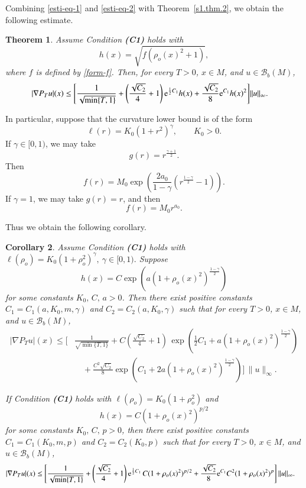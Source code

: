 \documentclass[11pt,twoside, reqno]{article}
\def\e{{\rm e}}
\newcommand\1{\mathbbm{1}}
\newtheorem{theorem}{Theorem}[section]
\newtheorem{corollary}[theorem]{Corollary}
\theoremstyle{definition}
\numberwithin{equation}{section}
\def \e{{\rm e}}
\begin{document}
Combining \eqref{esti-eq-1} and \eqref{esti-eq-2} with
Theorem~\ref{s1.thm.2}, we obtain the following estimate.

\begin{theorem}\label{h-theorem}
Assume Condition {\bf(C1)} holds with
\[
        h(x)=\sqrt{f(\rho_o(x)^2+1)},
\]
where \(f\) is defined by \eqref{form-f}. Then, for every \(T>0\),
\(x\in M\), and \(u\in\mathcal B_b(M)\),
\[
\begin{aligned}
|\nabla P_Tu|(x)
\leq
\Bigg[
&
\frac1{\sqrt{\min\{T,1\}}}
+
\left(\frac{\sqrt{C_2}}4+1\right)
\e^{\frac{1}{2}C_1} h(x)
+
\frac{\sqrt{C_2}}8
\e^{C_1}h(x)^2
\Bigg]\|u\|_\infty .
\end{aligned}
\]
\end{theorem}

In particular, suppose that the curvature lower bound is of the form
\[
        \ell(r)=K_0(1+r^2)^\gamma,
        \qquad K_0>0.
\]
If \(\gamma\in[0,1)\), we may take
\[
        g(r)=r^{\frac{\gamma+1}{2}}.
\]
Then
\[
        f(r)
        =
        M_0
        \exp\left(
        \frac{2a_0}{1-\gamma}
        \left(r^{\frac{1-\gamma}{2}}-1\right)
        \right).
\]
If \(\gamma=1\), we may take \(g(r)=r\), and then
\[
        f(r)=M_0r^{a_0}.
\]

Thus we obtain the following corollary.

\begin{corollary}\label{examples}
Assume Condition {\bf(C1)} holds with
\(
        \ell(\rho_o)=K_0(1+\rho_o^2)^\gamma,    \ 
        \gamma\in[0,1).
\)
Suppose
\[
        h(x)
        =
        C\exp\left(
        a(1+\rho_o(x)^2)^{\frac{1-\gamma}{2}}
        \right)
\]
for some constants \(K_0,\,C,\,a>0\). Then there exist positive constants
\(C_1=C_1(a,K_0,m,\gamma)\) and
\(C_2=C_2(a,K_0,\gamma)\) such that for every \(T>0\),
\(x\in M\), and \(u\in\mathcal B_b(M)\),
\[
\begin{aligned}
|\nabla P_Tu|(x)
\leq
\Biggl[
&
\frac1{\sqrt{\min\{T,1\}}}
+
C\left(\frac{\sqrt{C_2}}4+1\right)
\,
\exp\left(
        \frac{1}{2}C_1+a(1+\rho_o(x)^2)^{\frac{1-\gamma}{2}}
        \right)
\\
&\quad
+
\frac{C^2\sqrt{C_2}}8
\exp\left(
       C_1+ 2a(1+\rho_o(x)^2)^{\frac{1-\gamma}{2}}
        \right)
\Biggr]\, \|u\|_\infty .
\end{aligned}
\]

If Condition {\bf(C1)} holds with
\(
        \ell(\rho_o)=K_0(1+\rho_o^2)
\)
and
\[
        h(x)=C(1+\rho_o(x)^2)^{p/2}
\]
for some constants \(K_0,\, C,\, p>0\), then there exist positive constants
\(C_1=C_1(K_0,m,p)\) and \(C_2=C_2(K_0,p)\) such that  for every \(T>0\),
\(x\in M\), and \(u\in\mathcal B_b(M)\),
\[
\begin{aligned}
|\nabla P_Tu|(x)
\leq
\Biggl[
&
\frac1{\sqrt{\min\{T,1\}}}
+
\left(\frac{\sqrt{C_2}}4+1\right)
\e^{\frac{1}{2}C_1}\,
C(1+\rho_o(x)^2)^{p/2}
+
\frac{\sqrt{C_2}}8
\e^{C_1}
C^2(1+\rho_o(x)^2)^p
\Biggr]\, \|u\|_\infty .
\end{aligned}
\]
\end{corollary}
\end{document}
